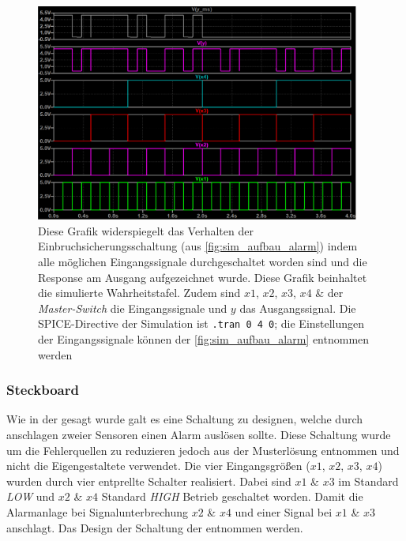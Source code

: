 \documentclass[12pt,english,ngerman]{scrartcl}
\begin{document}
\begin{figure}[H]
  \centering
    \includegraphics[width=0.95\textwidth]{./simdaten_lab/logic/master_verlauf.png}
  \caption{Diese Grafik widerspiegelt das Verhalten der
    Einbruchsicherungsschaltung (aus \autoref{fig:sim_aufbau_alarm}) indem alle
    möglichen Eingangssignale durchgeschaltet worden sind und die Response am
    Ausgang aufgezeichnet wurde. Diese Grafik beinhaltet die simulierte
    Wahrheitstafel. Zudem sind $x1$, $x2$, $x3$, $x4$ \&
    der \textit{Master-Switch} die Eingangssignale und $y$ das Ausgangssignal. Die
    SPICE-Directive der Simulation ist \texttt{.tran 0 4 0}; die
    Einstellungen der Eingangssignale können der \autoref{fig:sim_aufbau_alarm}
  entnommen werden}
  \label{fig:sim_alarm_wahrheit}
\end{figure}


\subsubsection{Steckboard}
Wie in der  gesagt wurde galt es eine Schaltung
zu designen, welche durch anschlagen zweier Sensoren einen Alarm auslösen
sollte. Diese Schaltung wurde um die Fehlerquellen zu reduzieren jedoch aus der
Musterlösung entnommen und nicht die Eigengestaltete verwendet. Die vier
Eingangsgrößen ($x1$, $x2$, $x3$, $x4$) wurden durch vier entprellte
Schalter realisiert. Dabei sind $x1$ \& $x3$ im Standard \textit{LOW} und
$x2$ \& $x4$ Standard \textit{HIGH} Betrieb geschaltet worden. Damit die
Alarmanlage bei Signalunterbrechung $x2$ \& $x4$ und einer Signal bei $x1$
\& $x3$ anschlagt. Das Design der Schaltung der 
entnommen werden.
\end{document}
